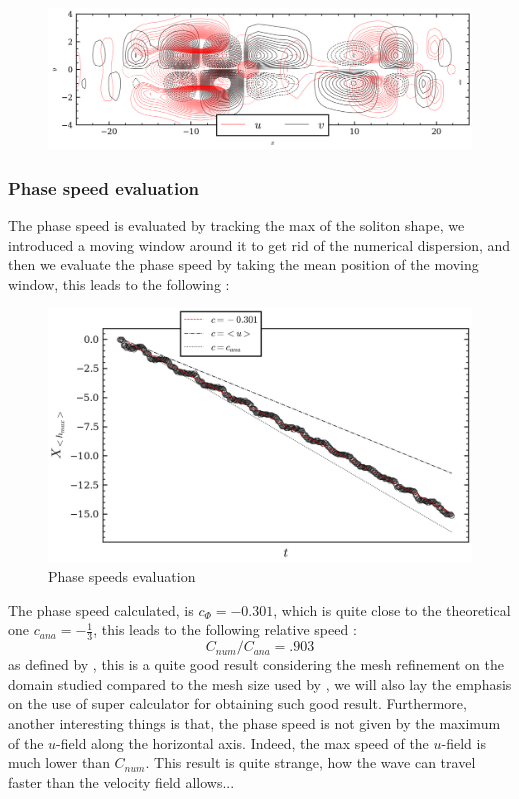 \documentclass[11pt,a4paper]{report}
\begin{document}
\begin{multicols}{2}
    \begin{figure}[H]
        \centering
        \includegraphics[width=1\linewidth]{./figure/velocity.png}
    \end{figure}


    \subsubsection{Phase speed evaluation}
    The phase speed is evaluated by tracking the max of the soliton shape, we introduced a moving window around it to get rid of the numerical dispersion, and then we evaluate the phase speed
    by taking the mean position of the moving window, this leads to the following :
    \begin{figure}[H]
        \includegraphics[width=1\linewidth]{./figure/mean_height.png}
        \caption{Phase speeds evaluation}
    \end{figure}
    The phase speed calculated, is $c_\Phi = -0.301$, which is quite close to the theoretical one $c_{ana} = -\frac{1}{3}$, this leads to the following relative speed : $$C_{num}/C_{ana} = .903$$ as defined by \cite{CF}, this is a quite good result considering the mesh refinement on the domain studied compared to the mesh size used by \cite{CF}, we will also lay the emphasis on the use of super calculator for obtaining such good result. Furthermore,  another interesting things is that,
    the phase speed is not given by the maximum of the $u$-field along the horizontal axis. Indeed, the max speed of the $u$-field is much lower than $C_{num}$. This result is quite strange, how the wave can travel faster than the velocity field allows...

\end{multicols}
\end{document}
